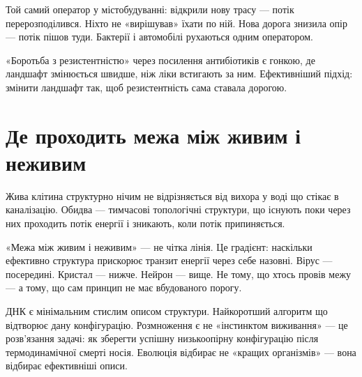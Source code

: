 \documentclass[12pt, a4paper, openany]{book}
\begin{document}
\begin{analogybox}
Той самий оператор у містобудуванні: відкрили нову трасу — потік перерозподілився. Ніхто не «вирішував» їхати по ній. Нова дорога знизила опір — потік пішов туди. Бактерії і автомобілі рухаються одним оператором.
\end{analogybox}

«Боротьба з резистентністю» через посилення антибіотиків є гонкою, де ландшафт змінюється швидше, ніж ліки встигають за ним. Ефективніший підхід: змінити ландшафт так, щоб резистентність сама ставала дорогою.

\section{Де проходить межа між живим і неживим}

Жива клітина структурно нічим не відрізняється від вихора у воді що стікає в каналізацію. Обидва — тимчасові топологічні структури, що існують поки через них проходить потік енергії і зникають, коли потік припиняється.

«Межа між живим і неживим» — не чітка лінія. Це градієнт: наскільки ефективно структура прискорює транзит енергії через себе назовні. Вірус — посередині. Кристал — нижче. Нейрон — вище. Не тому, що хтось провів межу — а тому, що сам принцип не має вбудованого порогу.

ДНК є мінімальним стислим описом структури. Найкоротший алгоритм що відтворює дану конфігурацію. Розмноження є не «інстинктом виживання» — це розв'язання задачі: як зберегти успішну низькоопірну конфігурацію після термодинамічної смерті носія. Еволюція відбирає не «кращих організмів» — вона відбирає ефективніші описи.
\end{document}
